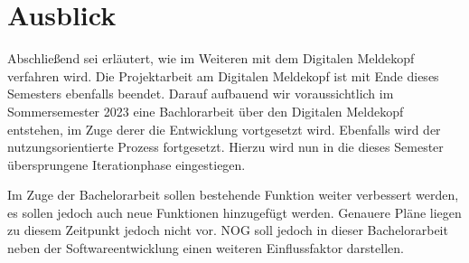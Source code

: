 \section{Ausblick}

Abschließend sei erläutert, wie im Weiteren mit dem Digitalen Meldekopf verfahren wird.
Die Projektarbeit am Digitalen Meldekopf ist mit Ende dieses Semesters ebenfalls beendet.
Darauf aufbauend wir voraussichtlich im Sommersemester 2023 eine Bachlorarbeit über den Digitalen Meldekopf entstehen, im Zuge derer die Entwicklung vortgesetzt wird.
Ebenfalls wird der nutzungsorientierte Prozess fortgesetzt.
Hierzu wird nun in die dieses Semester übersprungene Iterationphase eingestiegen.

Im Zuge der Bachelorarbeit sollen bestehende Funktion weiter verbessert werden, es sollen jedoch auch neue Funktionen hinzugefügt werden.
Genauere Pläne liegen zu diesem Zeitpunkt jedoch nicht vor.
NOG soll jedoch in dieser Bachelorarbeit neben der Softwareentwicklung einen weiteren Einflussfaktor darstellen.